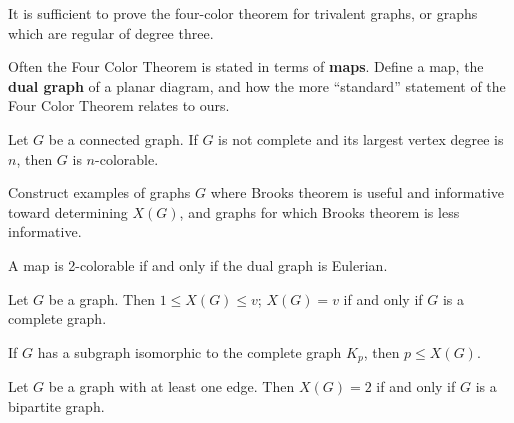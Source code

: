\begin{theorem} It is sufficient to prove the four-color theorem for trivalent graphs, or graphs which are regular of degree three.
\end{theorem}

\begin{exercise} Often the Four Color Theorem is stated in terms of \textbf{maps}.  Define a map, the \textbf{dual graph} of a planar diagram, and how the more ``standard'' statement of the Four Color Theorem relates to ours.
\end{exercise}

\begin{theorem}[Brooks] Let $G$ be a connected graph.  If $G$ is not complete and its largest vertex degree is $n$, then $G$ is $n$-colorable.
\end{theorem}

\begin{examples}  Construct examples of graphs $G$ where Brooks theorem is useful and informative toward determining $X(G)$, and graphs for which Brooks theorem is less informative.
\end{examples}

\begin{claim} A map is 2-colorable if and only if the dual graph is Eulerian.
\end{claim}

\begin{theorem} Let $G$ be a graph.  Then $1 \leq X(G) \leq v$; $X(G) = v$ if and only if $G$ is a complete graph.
\end{theorem}

\begin{corollary} If $G$ has a subgraph isomorphic to the complete graph $K_p$, then $p \leq X(G)$.
\end{corollary}

\begin{theorem} Let $G$ be a graph with at least one edge.  Then $X(G)=2$ if and only if $G$ is a bipartite graph.
\end{theorem}
